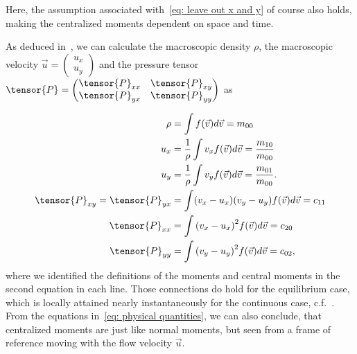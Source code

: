 Here, the assumption associated with~\eqref{eq: leave out x and y} of course also holds, making the centralized moments dependent on space and time.

As deduced in~\cite[pages 23 ff.]{harris2004introduction}, we can calculate the macroscopic density $\rho$, the macroscopic velocity $\vec{u}=\begin{pmatrix}u_x\\u_y\end{pmatrix}$ and the pressure tensor $\tensor{P}=\begin{pmatrix}\tensor{P}_{xx}&\tensor{P}_{xy}\\ \tensor{P}_{yx}&\tensor{P}_{yy}\end{pmatrix}$ as

\begin{equation}
  \label{eq: physical quantities}
  \begin{aligned}
    \rho & = \int f(\vec{v}) d\vec{v} = m_{00} \\
    u_x
    & = \frac{1}{\rho}\int v_x f(\vec{v}) d\vec{v} = \frac{ m_{10} }{ m_{00} }\\
    u_y
    & = \frac{1}{\rho}\int v_y f(\vec{v}) d\vec{v} = \frac{ m_{01} }{ m_{00} }.\\
    \tensor{P}_{xy}=\tensor{P}_{yx}
    & = \int (v_x - u_x)(v_y - u_y) f(\vec{v}) d\vec{v}
      = c_{11} \\
    \tensor{P}_{xx}
    & = \int {(v_x - u_x)}^2 f(\vec{v}) d\vec{v}
      = c_{20} \\
    \tensor{P}_{yy}
    & = \int {(v_y - u_y)}^2 f(\vec{v}) d\vec{v}
      = c_{02},
  \end{aligned}
\end{equation}
where we identified the definitions of the moments and central moments in the second equation in each line.
Those connections do hold for the equilibrium case, which is locally attained nearly instantaneously for the continuous case, c.f.~\cite[page 218]{smits2000physical}.
From the equations in~\eqref{eq: physical quantities}, we can also conclude, that centralized moments are just like normal moments, but seen from a frame of reference moving with the flow velocity $\vec{u}$.

